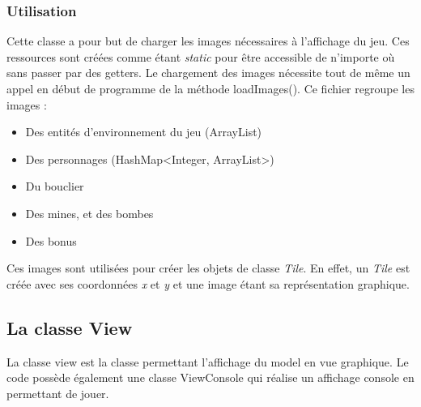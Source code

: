 \documentclass[a4paper,12pt]{article} %
\begin{document}
\subsubsection{Utilisation}
Cette classe a pour but de charger les images nécessaires à l’affichage du jeu. Ces ressources sont créées comme étant \textit{static} pour être accessible de n’importe où sans passer par des getters. Le chargement des images nécessite tout de même un appel en début de programme de la méthode loadImages().
Ce fichier regroupe les images :
\begin{itemize}
\item Des entités d’environnement du jeu (ArrayList)
\item Des personnages (HashMap<Integer, ArrayList>)
\item Du bouclier
\item Des mines, et des bombes
\item Des bonus
\end{itemize}
Ces images sont utilisées pour créer les objets de classe \textit{Tile}. En effet, un \textit{Tile} est créée avec ses coordonnées \textit{x} et \textit{y} et une image étant sa représentation graphique.
\subsection{La classe View}
La classe view est la classe permettant l’affichage du model en vue graphique. Le code possède également une classe ViewConsole qui réalise un affichage console en permettant de jouer. 
\end{document}
